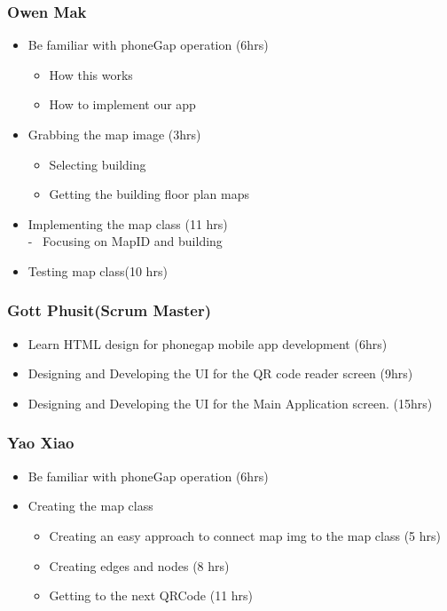 \documentclass[12pt]{article}
\begin{document}
\subsubsection*{Owen Mak}
\begin{itemize}
\item Be familiar with phoneGap operation (6hrs)
\begin{itemize} \renewcommand{\labelitemii}{-}
	\item How this works
	\item How to implement our app
\end{itemize}

\item Grabbing the map image   (3hrs)
\begin{itemize} \renewcommand{\labelitemii}{-}
	\item Selecting building
	\item Getting the building floor plan maps
\end{itemize}

\item Implementing the map class (11 hrs) \\ - \ Focusing on MapID and building 
\item Testing map class(10 hrs)
\end{itemize}



\subsubsection*{Gott Phusit(Scrum Master)}
\begin{itemize}
\item Learn HTML design for phonegap mobile app development (6hrs)
\item Designing and Developing the UI for the QR code reader screen (9hrs)
\item Designing and Developing the UI for the Main Application screen. (15hrs)

\end{itemize}

\subsubsection*{Yao Xiao}
\begin{itemize}
\item Be familiar with phoneGap operation (6hrs)
\item Creating the map class  
	\begin{itemize}
		\item Creating an easy approach to connect map img to the map class (5 hrs)
		\item Creating edges and nodes (8 hrs)		
		\item Getting to the next QRCode (11 hrs)
	\end{itemize}

\end{itemize}
\end{document}
